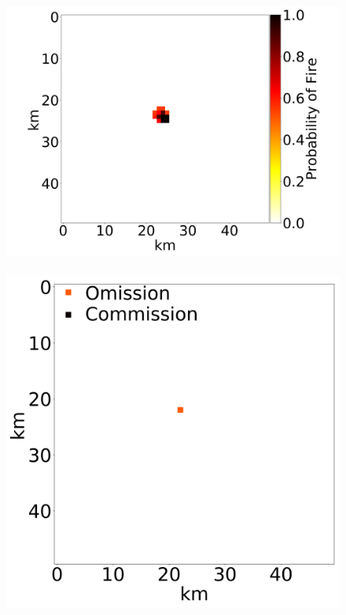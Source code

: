 \documentclass[smallcondensed]{svjour3}     %
\begin{document}
\begin{figure}[htbp]
	~
	\includegraphics[height=0.17\textheight]{exampleNetworkProcessed1.png}
	~
	\includegraphics[height=0.17\textheight]{exampleNetworkError1.png}
	\\

\end{figure}
\end{document}
